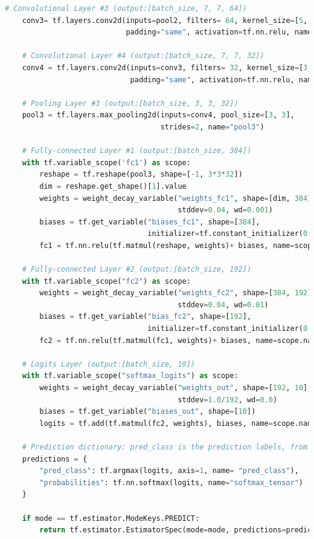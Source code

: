 \documentclass[hyperref]{article}
\theoremstyle{nonumberplain}
\begin{document}
\begin{appendices}
\begin{lstlisting}[language=Python]
    # Convolutional Layer #3 (output:[batch_size, 7, 7, 64])
    conv3= tf.layers.conv2d(inputs=pool2, filters= 64, kernel_size=[5, 5],
                            padding="same", activation=tf.nn.relu, name="conv3")

    # Convolutional Layer #4 (output:[batch_size, 7, 7, 32])
    conv4 = tf.layers.conv2d(inputs=conv3, filters= 32, kernel_size=[3, 3],
                             padding="same", activation=tf.nn.relu, name="conv4")

    # Pooling Layer #3 (output:[batch_size, 3, 3, 32])
    pool3 = tf.layers.max_pooling2d(inputs=conv4, pool_size=[3, 3],
                                    strides=2, name="pool3")

    # Fully-connected Layer #1 (output:[batch_size, 384])
    with tf.variable_scope('fc1') as scope:
        reshape = tf.reshape(pool3, shape=[-1, 3*3*32])
        dim = reshape.get_shape()[1].value
        weights = weight_decay_variable("weights_fc1", shape=[dim, 384],
                                        stddev=0.04, wd=0.001)
        biases = tf.get_variable("biases_fc1", shape=[384],
                                 initializer=tf.constant_initializer(0.1))
        fc1 = tf.nn.relu(tf.matmul(reshape, weights)+ biases, name=scope.name)

    # Fully-connected Layer #2 (output:[batch_size, 192])
    with tf.variable_scope("fc2") as scope:
        weights = weight_decay_variable("weights_fc2", shape=[384, 192],
                                        stddev=0.04, wd=0.01)
        biases = tf.get_variable("bias_fc2", shape=[192],
                                 initializer=tf.constant_initializer(0.1))
        fc2 = tf.nn.relu(tf.matmul(fc1, weights)+ biases, name=scope.name)

    # Logits Layer (output:[batch_size, 10])
    with tf.variable_scope("softmax_logits") as scope:
        weights = weight_decay_variable("weights_out", shape=[192, 10],
                                        stddev=1.0/192, wd=0.0)
        biases = tf.get_variable("biases_out", shape=[10])
        logits = tf.add(tf.matmul(fc2, weights), biases, name=scope.name)

    # Prediction dictionary: pred_class is the prediction labels, from 0 to 9.
    predictions = {
        "pred_class": tf.argmax(logits, axis=1, name= "pred_class"),
        "probabilities": tf.nn.softmax(logits, name="softmax_tensor")
    }

    if mode == tf.estimator.ModeKeys.PREDICT:
        return tf.estimator.EstimatorSpec(mode=mode, predictions=predictions)


\end{lstlisting}
\end{appendices}
\end{document}
